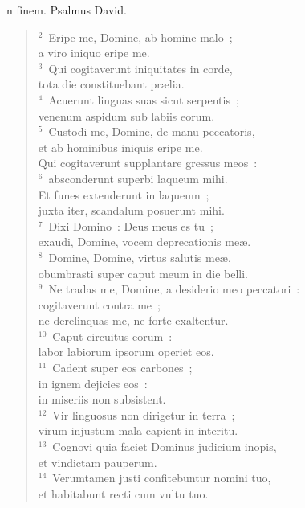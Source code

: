 \bchapter
{}n finem. Psalmus David.
\begin{flushleft}\begin{verse}\vspace{6pt}${}^{2}$~Eripe me, Domine, ab homine malo~;\\ a viro iniquo eripe me.\\
${}^{3}$~Qui cogitaverunt iniquitates in corde,\\ tota die constituebant pr\ae lia.\\
${}^{4}$~Acuerunt linguas suas sicut serpentis~;\\ venenum aspidum sub labiis eorum.\\
${}^{5}$~Custodi me, Domine, de manu peccatoris,\\ et ab hominibus iniquis eripe me.\\ Qui cogitaverunt supplantare gressus meos~:\\
${}^{6}$~absconderunt superbi laqueum mihi.\\ Et funes extenderunt in laqueum~;\\ juxta iter, scandalum posuerunt mihi.\\
${}^{7}$~Dixi Domino~: Deus meus es tu~;\\ exaudi, Domine, vocem deprecationis me\ae .\\
${}^{8}$~Domine, Domine, virtus salutis me\ae ,\\ obumbrasti super caput meum in die belli.\\
${}^{9}$~Ne tradas me, Domine, a desiderio meo peccatori~:\\ cogitaverunt contra me~;\\ ne derelinquas me, ne forte exaltentur.\\
${}^{10}$~Caput circuitus eorum~:\\ labor labiorum ipsorum operiet eos.\\
${}^{11}$~Cadent super eos carbones~;\\ in ignem dejicies eos~:\\ in miseriis non subsistent.\\
${}^{12}$~Vir linguosus non dirigetur in terra~;\\ virum injustum mala capient in interitu.\\
${}^{13}$~Cognovi quia faciet Dominus judicium inopis,\\ et vindictam pauperum.\\
${}^{14}$~Verumtamen justi confitebuntur nomini tuo,\\ et habitabunt recti cum vultu tuo.\end{verse}\end{flushleft}



